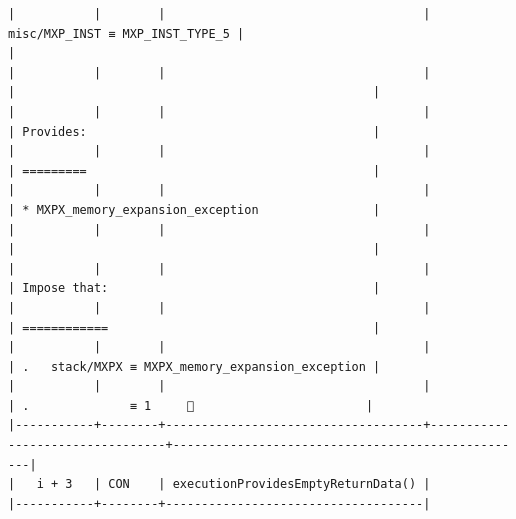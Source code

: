 \documentclass[varwidth=\maxdimen,margin=0.5cm,multi={verbatim}]{standalone}
\begin{document}
\begin{verbatim}
|           |        |                                    | misc/MXP_INST ≡ MXP_INST_TYPE_5 |                                                  |
|           |        |                                    |                                 |                                                  |
|           |        |                                    |                                 | Provides:                                        |
|           |        |                                    |                                 | =========                                        |
|           |        |                                    |                                 | * MXPX_memory_expansion_exception                |
|           |        |                                    |                                 |                                                  |
|           |        |                                    |                                 | Impose that:                                     |
|           |        |                                    |                                 | ============                                     |
|           |        |                                    |                                 | .   stack/MXPX ≡ MXPX_memory_expansion_exception |
|           |        |                                    |                                 | .              ≡ 1     👋                        |
|-----------+--------+------------------------------------+---------------------------------+--------------------------------------------------|
|   i + 3   | CON    | executionProvidesEmptyReturnData() |
|-----------+--------+------------------------------------|


\end{verbatim}
\end{document}
